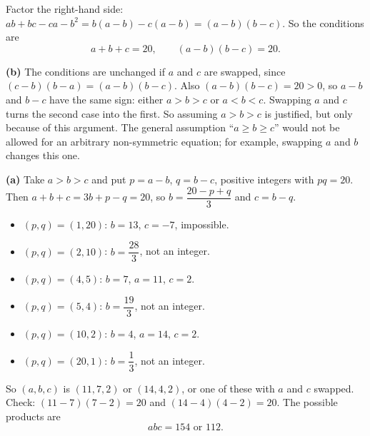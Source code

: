 Factor the right-hand side: $ab+bc-ca-b^2=b(a-b)-c(a-b)=(a-b)(b-c)$. So the conditions are
\[a+b+c=20,\qquad(a-b)(b-c)=20.\]

\textbf{(b)} The conditions are unchanged if $a$ and $c$ are swapped, since $(c-b)(b-a)=(a-b)(b-c)$. Also $(a-b)(b-c)=20>0$, so $a-b$ and $b-c$ have the same sign: either $a>b>c$ or $a<b<c$. Swapping $a$ and $c$ turns the second case into the first. So assuming $a>b>c$ is justified, but only because of this argument. The general assumption ``$a\ge b\ge c$'' would not be allowed for an arbitrary non-symmetric equation; for example, swapping $a$ and $b$ changes this one.

\textbf{(a)} Take $a>b>c$ and put $p=a-b$, $q=b-c$, positive integers with $pq=20$. Then $a+b+c=3b+p-q=20$, so $b=\dfrac{20-p+q}{3}$ and $c=b-q$.
\begin{itemize}
\item $(p,q)=(1,20)$: $b=13$, $c=-7$, impossible.
\item $(p,q)=(2,10)$: $b=\dfrac{28}{3}$, not an integer.
\item $(p,q)=(4,5)$: $b=7$, $a=11$, $c=2$.
\item $(p,q)=(5,4)$: $b=\dfrac{19}{3}$, not an integer.
\item $(p,q)=(10,2)$: $b=4$, $a=14$, $c=2$.
\item $(p,q)=(20,1)$: $b=\dfrac13$, not an integer.
\end{itemize}
So $(a,b,c)$ is $(11,7,2)$ or $(14,4,2)$, or one of these with $a$ and $c$ swapped. Check: $(11-7)(7-2)=20$ and $(14-4)(4-2)=20$. The possible products are
\[abc=\boxed{154\text{ or }112}.\]
